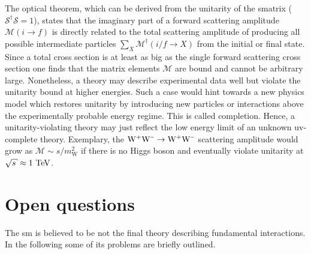 The optical theorem, which can be derived from the unitarity of the \gls{smatrix} ($\mathcal{S}^{\dagger}\mathcal{S}=1$), states that the imaginary part of a forward scattering amplitude $\mathcal{M}(i\to f)$ is directly related to the total scattering amplitude of producing all possible intermediate particles $\sum_{X}\mathcal{M}^\dagger(i/f\to X)$ from the initial or final state. Since a total cross section is at least as big as the single forward scattering cross section one finds that the matrix elements $\mathcal{M}$ are bound and cannot be arbitrary large. Nonetheless, a theory may describe experimental data well but violate the unitarity bound at higher energies. Such a case would hint towards a new physics model which restores unitarity by introducing new particles or interactions above the experimentally probable energy regime. This is called  completion. Hence, a unitarity-violating theory may just reflect the low energy limit of an unknown \gls{uv}-complete theory. Exemplary, the $\mathrm{W}^{\rmplus}\mathrm{W}^{\rmminus}\to\mathrm{W}^{\rmplus}\mathrm{W}^{\rmminus}$ scattering amplitude would grow as $\mathcal{M}\sim s/m_\mathrm{W}^2$ if there is no Higgs boson and eventually violate unitarity at $\sqrt{s}\approx1~\TeV$.


\section{Open questions}

The \gls{sm} is believed to be not the final theory describing fundamental interactions. In the following some of its problems are briefly outlined.

